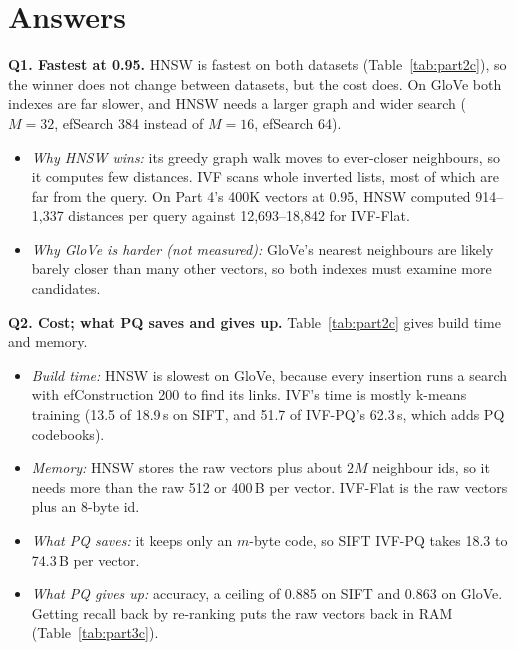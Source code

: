 \documentclass[10pt,twocolumn]{article}
\begin{document}
\section{Answers}

\textbf{Q1. Fastest at 0.95.} HNSW is fastest on both datasets (Table~\ref{tab:part2c}), so the
winner does not change between datasets, but the cost does. On GloVe both indexes are far slower,
and HNSW needs a larger graph and wider search ($M{=}32$, efSearch 384 instead of $M{=}16$,
efSearch 64).
\begin{itemize}
\item \emph{Why HNSW wins:} its greedy graph walk moves to ever-closer neighbours, so it computes
  few distances. IVF scans whole inverted lists, most of which are far from the query. On Part 4's
  400K vectors at 0.95, HNSW computed 914--1,337 distances per query against 12,693--18,842 for
  IVF-Flat.
\item \emph{Why GloVe is harder (not measured):} GloVe's nearest neighbours are likely barely
  closer than many other vectors, so both indexes must examine more candidates.
\end{itemize}

\textbf{Q2. Cost; what PQ saves and gives up.} Table~\ref{tab:part2c} gives build time and
memory.
\begin{itemize}
\item \emph{Build time:} HNSW is slowest on GloVe, because every insertion runs a search with
  efConstruction 200 to find its links. IVF's time is mostly k-means training (13.5 of 18.9\,s on
  SIFT, and 51.7 of IVF-PQ's 62.3\,s, which adds PQ codebooks).
\item \emph{Memory:} HNSW stores the raw vectors plus about $2M$ neighbour ids, so it needs more
  than the raw 512 or 400\,B per vector. IVF-Flat is the raw vectors plus an 8-byte id.
\item \emph{What PQ saves:} it keeps only an $m$-byte code, so SIFT IVF-PQ takes 18.3 to
  74.3\,B per vector.
\item \emph{What PQ gives up:} accuracy, a ceiling of 0.885 on SIFT and 0.863 on GloVe. Getting
  recall back by re-ranking puts the raw vectors back in RAM (Table~\ref{tab:part3c}).
\end{itemize}
\end{document}
